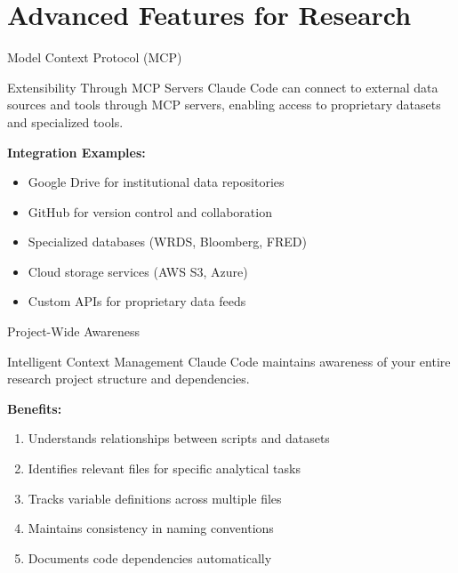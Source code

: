 \documentclass[10pt]{beamer}
\begin{document}
	\section{Advanced Features for Research}
	
	\begin{frame}{Model Context Protocol (MCP)}
		\begin{alertblock}{Extensibility Through MCP Servers}
			Claude Code can connect to external data sources and tools through MCP servers, enabling access to proprietary datasets and specialized tools.
		\end{alertblock}
		
		\vspace{0.5cm}
		
		\textbf{Integration Examples:}
		\begin{itemize}
			\item Google Drive for institutional data repositories
			\item GitHub for version control and collaboration
			\item Specialized databases (WRDS, Bloomberg, FRED)
			\item Cloud storage services (AWS S3, Azure)
			\item Custom APIs for proprietary data feeds
		\end{itemize}
	\end{frame}
	
	\begin{frame}{Project-Wide Awareness}
		\begin{block}{Intelligent Context Management}
			Claude Code maintains awareness of your entire research project structure and dependencies.
		\end{block}
		
		\vspace{0.5cm}
		
		\textbf{Benefits:}
		\begin{enumerate}
			\item Understands relationships between scripts and datasets
			\item Identifies relevant files for specific analytical tasks
			\item Tracks variable definitions across multiple files
			\item Maintains consistency in naming conventions
			\item Documents code dependencies automatically
		\end{enumerate}
	\end{frame}
	
\end{document}
